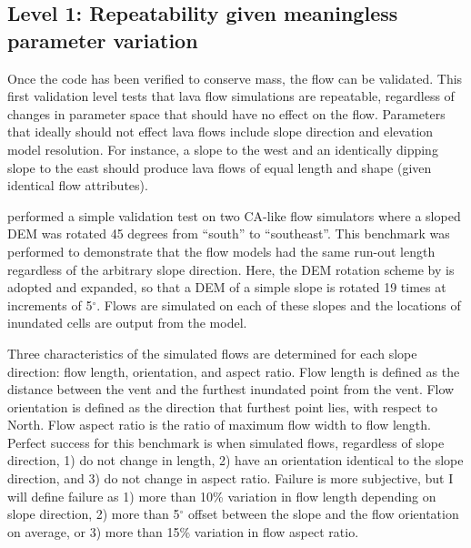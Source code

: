 \documentclass[12pt,letter]{article}
\begin{document}
	\subsection{Level 1: Repeatability given meaningless parameter variation}
		Once the code has been verified to conserve mass, the flow can be validated. This first validation level tests that lava flow simulations are repeatable, regardless of changes in parameter space that should have no effect on the flow. Parameters that ideally should not effect lava flows include slope direction and elevation model resolution. For instance, a slope to the west and an identically dipping slope to the east should produce lava flows of equal length and shape (given identical flow attributes).
		
		\citet{miyamoto1997simulating} performed a simple validation test on two CA-like flow simulators \citep{ishihara1990numerical,miyamoto1997simulating} where a sloped DEM was rotated 45 degrees from ``south'' to ``southeast''. This benchmark was performed to demonstrate that the flow models had the same run-out length regardless of the arbitrary slope direction. Here, the DEM rotation scheme by \citet{miyamoto1997simulating} is adopted and expanded, so that a DEM of a simple slope is rotated 19 times at increments of 5$^{\circ}$. Flows are simulated on each of these slopes and the locations of inundated cells are output from the model.
		
		Three characteristics of the simulated flows are determined for each slope direction: flow length, orientation, and aspect ratio. Flow length is defined as the distance between the vent and the furthest inundated point from the vent. Flow orientation is defined as the direction that furthest point lies, with respect to North. Flow aspect ratio is the ratio of maximum flow width to flow length. Perfect success for this benchmark is when simulated flows, regardless of slope direction, 1) do not change in length, 2) have an orientation identical to the slope direction, and 3) do not change in aspect ratio. Failure is more subjective, but I will define failure as 1) more than 10\% variation in flow length depending on slope direction, 2) more than 5$^{\circ}$ offset between the slope and the flow orientation on average, or 3) more than 15\% variation in flow aspect ratio.
		
\end{document}
